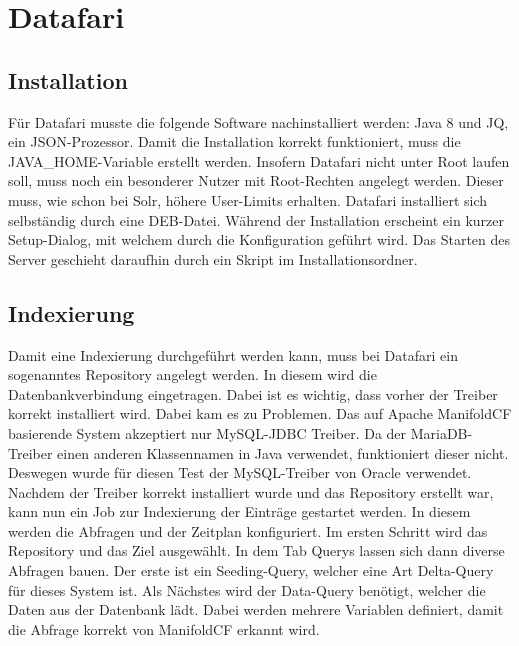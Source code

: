 
\section{Datafari}

\subsection{Installation}

Für Datafari musste die folgende Software nachinstalliert werden: Java 8 und JQ, ein JSON-Prozessor. Damit die Installation korrekt funktioniert, muss die JAVA\_HOME-Variable erstellt werden. Insofern Datafari nicht unter Root laufen soll, muss noch ein besonderer Nutzer mit Root-Rechten angelegt werden. Dieser muss, wie schon bei Solr, höhere User-Limits erhalten. Datafari installiert sich selbständig durch eine DEB-Datei. Während der Installation erscheint ein kurzer Setup-Dialog, mit welchem durch die Konfiguration geführt wird. Das Starten des Server geschieht daraufhin durch ein Skript im Installationsordner.

\subsection{Indexierung}

Damit eine Indexierung durchgeführt werden kann, muss bei Datafari ein sogenanntes Repository angelegt werden. In diesem wird die Datenbankverbindung eingetragen. Dabei ist es wichtig, dass vorher der Treiber korrekt installiert wird. Dabei kam es zu Problemen.
Das auf Apache ManifoldCF basierende System akzeptiert nur MySQL-JDBC Treiber. Da der MariaDB-Treiber einen anderen Klassennamen in Java verwendet, funktioniert dieser nicht. \cite[S.~61]{ApacheSoftwareFoundation.} Deswegen wurde für diesen Test der MySQL-Treiber von Oracle verwendet.
Nachdem der Treiber korrekt installiert wurde und das Repository erstellt war, kann nun ein Job zur Indexierung der Einträge gestartet werden. In diesem werden die Abfragen und der Zeitplan konfiguriert.
Im ersten Schritt wird das Repository und das Ziel ausgewählt. In dem Tab Querys lassen sich dann diverse Abfragen bauen. Der erste ist ein Seeding-Query, welcher eine Art Delta-Query für dieses System ist. Als Nächstes wird der Data-Query benötigt, welcher die Daten aus der Datenbank lädt. Dabei werden mehrere Variablen definiert, damit die Abfrage korrekt von ManifoldCF erkannt wird. 

